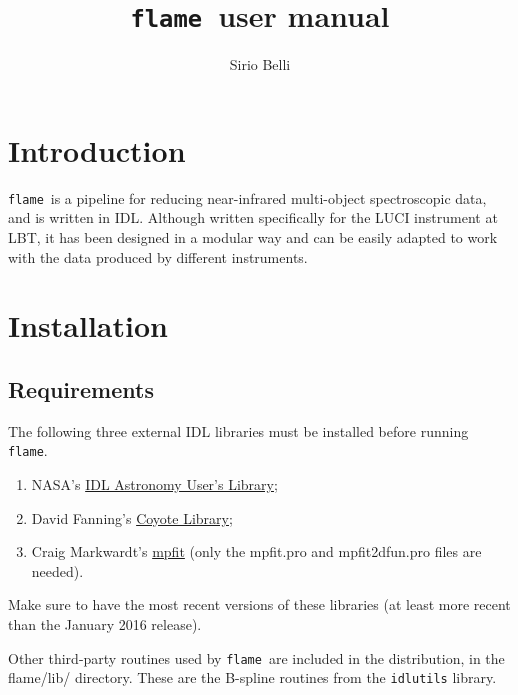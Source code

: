 \documentclass[a4paper, notitlepage]{article}
\newcommand{\flame}{\texttt{flame}}
\begin{document}
\title{\flame\ user manual}
\author{Sirio Belli}
\maketitle





\section{Introduction}

\flame\ is a pipeline for reducing near-infrared multi-object spectroscopic data, and is written in IDL. Although written specifically for the LUCI instrument at LBT, it has been designed in a modular way and can be easily adapted to work with the data produced by different instruments.





\section{Installation}

\subsection{Requirements}

The following three external IDL libraries must be installed before running \flame.
\begin{enumerate}
\item NASA's \href{http://idlastro.gsfc.nasa.gov/}{IDL Astronomy User's Library};
\item David Fanning's \href{http://www.idlcoyote.com/code_tips/installcoyote.php}{Coyote Library};
\item Craig Markwardt's \href{https://www.physics.wisc.edu/~craigm/idl/fitting.html}{mpfit} (only the mpfit.pro and mpfit2dfun.pro files are needed). 
\end{enumerate}
Make sure to have the most recent versions of these libraries (at least more recent than the January 2016 release).

Other third-party routines used by \flame\ are included in the distribution, in the flame/lib/ directory. These are the B-spline routines from the \texttt{idlutils} library.
\end{document}
